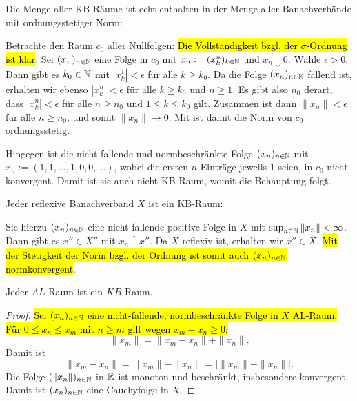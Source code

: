 \begin{bsp}
Die Menge aller KB-Räume ist echt enthalten in der Menge aller Banachverbände mit ordnungsstetiger Norm:  

\par
Betrachte den Raum $c_0$ aller Nullfolgen: \hl{Die Vollständigkeit bzgl. der $\sigma$-Ordnung ist klar}. Sei $(x_n)_{n\in\mathbb{N}}$ eine Folge in $c_0$ mit $x_n:=(x_k^n)_{k\in\mathbb{N}}$ und $x_n\downarrow 0$. Wähle $\epsilon >0$. Dann gibt es  $k_0\in\mathbb{N}$ mit $|x_k^1|<\epsilon$ für alle $k\geq k_0$. Da die Folge $(x_n)_{n\in\mathbb{N}}$ fallend ist, erhalten wir ebenso $|x_k^n|< \epsilon$ für alle $k\geq k_0$ und $n\geq1$. Es gibt also $n_0$ derart, dass $|x_k^n|<\epsilon$ für alle $n\geq n_0$ und $1\leq k\leq  k_0$ gilt. Zusammen ist dann $\|x_n\|<\epsilon$ für alle $n\geq n_0$, und somit $\|x_n\|\to 0$. Mit \Cref{} ist damit die Norm von $c_0$ ordnungsstetig.

\par
Hingegen ist die nicht-fallende und normbeschränkte Folge $(x_n)_{n\in\mathbb{N}}$ mit  $x_n:=(1,1,\dots,1,0,0,\dots)$, wobei die ersten $n$ Einträge jeweils $1$ seien, in $c_0$ nicht konvergent. Damit ist sie auch nicht KB-Raum, womit die Behauptung folgt.
\end{bsp}


\begin{bsp}
Jeder reflexive Banachverband $X$ ist ein KB-Raum: 

\par
Sie hierzu $(x_n)_{n\in\mathbb{N}}$ eine nicht-fallende positive Folge in $X$ mit $\sup_{n\in\mathbb{N}}\|x_n\|<\infty$. Dann gibt es $x''\in X''$ mit $x_n\uparrow x''$. Da $X$ reflexiv ist, erhalten wir $x''\in X$. \hl{Mit der Stetigkeit der Norm bzgl. der Ordnung ist somit auch $(x_n)_{n\in\mathbb{N}}$ normkonvergent}.
\end{bsp}


\begin{prop}
Jeder $AL$-Raum ist ein $KB$-Raum. 
\end{prop}

\begin{proof}
\hl{Sei $(x_n)_{n\in\mathbb{N}}$ eine nicht-fallende, normbeschränkte Folge in $X$ AL-Raum. Für $0\leq x_n\leq x_m$ mit $n\geq m$ gilt wegen $x_m - x_n\geq0$:}
\begin{equation*}
\|x_m\| = \|x_m - x_n\| + \|x_n\|.
\end{equation*}
Damit ist 
\begin{equation*}
\|x_m - x_n\| = \|x_m \| - \|x_n\| = \big|\|x_m\| - \|x_n\| \big |.    
\end{equation*}
Die Folge $(\|x_n \|)_{n\in\mathbb{N}}$ in $\mathbb{R}$ ist monoton und beschränkt,  insbesondere konvergent. Damit ist $(x_n)_{n\in\mathbb{N}}$ eine Cauchyfolge in $X$.
\end{proof}


